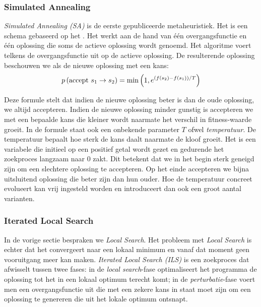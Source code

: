 \subsubsection{Simulated Annealing}

\emph{Simulated Annealing (SA)} is de eerste gepubliceerde metaheuristiek. Het is een schema gebaseerd op het . Het werkt aan de hand van \'e\'en overgangsfunctie en \'e\'en oplossing die soms de actieve oplossing wordt genoemd. Het algoritme voert telkens de overgangsfunctie uit op de actieve oplossing. De resulterende oplossing beschouwen we als de nieuwe oplossing met een kans:
\begin{equation}
p\left(\mbox{accept $s_1\rightarrow s_2$}\right)=\min\left(1,e^{\left(f\left(s_2\right)-f\left(s_1\right)\right)/T}\right)
\end{equation}

Deze formule stelt dat indien de nieuwe oplossing beter is dan de oude oplossing, we altijd accepteren. Indien de nieuwe oplossing minder gunstig is accepteren we met een bepaalde kans die kleiner wordt naarmate het verschil in fitness-waarde groeit. In de formule staat ook een onbekende parameter $T$ ofwel \emph{temperatuur}. De temperatuur bepaalt hoe sterk de kans daalt naarmate de kloof groeit. Het is een variabele die initieel op een positief getal wordt gezet en gedurende het zoekproces langzaam naar 0 zakt. Dit betekent dat we in het begin sterk geneigd zijn om een slechtere oplossing te accepteren. Op het einde accepteren we bijna uitsluitend oplossing die beter zijn dan hun ouder. Hoe de temperatuur concreet evolueert kan vrij ingesteld worden en introduceert dan ook een groot aantal varianten.

\subsubsection{Iterated Local Search}

In de vorige sectie bespraken we \emph{Local Search}. Het probleem met \emph{Local Search} is echter dat het convergeert naar een lokaal minimum en vanaf dat moment geen vooruitgang meer kan maken. \emph{Iterated Local Search (ILS)} is een zoekproces dat afwisselt tussen twee fases: in de \emph{local search}-fase optimaliseert het programma de oplossing tot het in een lokaal optimum terecht komt; in de \emph{perturbatie}-fase voert men een overgangsfunctie uit die met een zekere kans in staat moet zijn om een oplossing te genereren die uit het lokale optimum ontsnapt.

